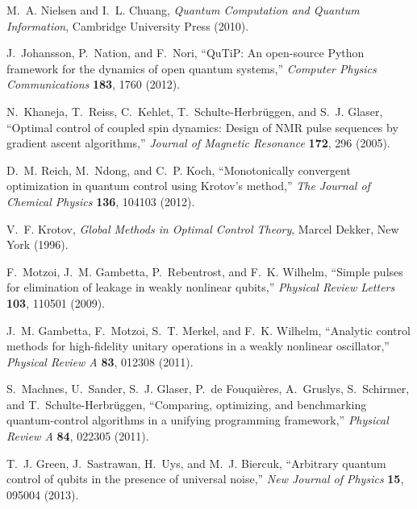 \documentclass[11pt,a4paper]{article}
\theoremstyle{definition}
\theoremstyle{remark}
\begin{document}
\begin{enumerate}[label={[\arabic*]}]
    \item M.~A. Nielsen and I.~L. Chuang, \emph{Quantum Computation and Quantum Information}, Cambridge University Press (2010).

    \item J.~Johansson, P.~Nation, and F.~Nori, ``QuTiP: An open-source Python framework for the dynamics of open quantum systems,'' \emph{Computer Physics Communications} \textbf{183}, 1760 (2012).

    \item N.~Khaneja, T.~Reiss, C.~Kehlet, T.~Schulte-Herbr\"uggen, and S.~J. Glaser, ``Optimal control of coupled spin dynamics: Design of NMR pulse sequences by gradient ascent algorithms,'' \emph{Journal of Magnetic Resonance} \textbf{172}, 296 (2005).

    \item D.~M. Reich, M.~Ndong, and C.~P. Koch, ``Monotonically convergent optimization in quantum control using Krotov's method,'' \emph{The Journal of Chemical Physics} \textbf{136}, 104103 (2012).

    \item V.~F. Krotov, \emph{Global Methods in Optimal Control Theory}, Marcel Dekker, New York (1996).

    \item F.~Motzoi, J.~M. Gambetta, P.~Rebentrost, and F.~K. Wilhelm, ``Simple pulses for elimination of leakage in weakly nonlinear qubits,'' \emph{Physical Review Letters} \textbf{103}, 110501 (2009).

    \item J.~M. Gambetta, F.~Motzoi, S.~T. Merkel, and F.~K. Wilhelm, ``Analytic control methods for high-fidelity unitary operations in a weakly nonlinear oscillator,'' \emph{Physical Review A} \textbf{83}, 012308 (2011).

    \item S.~Machnes, U.~Sander, S.~J. Glaser, P.~de Fouquières, A.~Gruslys, S.~Schirmer, and T.~Schulte-Herbr\"uggen, ``Comparing, optimizing, and benchmarking quantum-control algorithms in a unifying programming framework,'' \emph{Physical Review A} \textbf{84}, 022305 (2011).

    \item T.~J. Green, J.~Sastrawan, H.~Uys, and M.~J. Biercuk, ``Arbitrary quantum control of qubits in the presence of universal noise,'' \emph{New Journal of Physics} \textbf{15}, 095004 (2013).


\end{enumerate}
\end{document}
